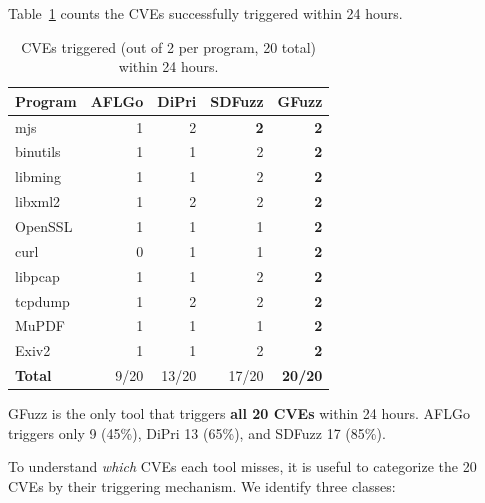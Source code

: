 \documentclass[preprint,12pt,3p]{elsarticle}
\begin{document}
Table~\ref{tbl:bugs} counts the CVEs successfully triggered within 24 hours.

\begin{table}[t]
\centering
\small
\caption{CVEs triggered (out of 2 per program, 20 total) within 24 hours.}
\label{tbl:bugs}
\begin{tabular}{lrrrr}
\toprule
\textbf{Program} & \textbf{AFLGo} & \textbf{DiPri}
  & \textbf{SDFuzz} & \textbf{GFuzz} \\
\midrule
mjs           & 1 & 2 & \textbf{2} & \textbf{2} \\
binutils      & 1 & 1 & 2 & \textbf{2} \\
libming       & 1 & 1 & 2 & \textbf{2} \\
libxml2       & 1 & 2 & 2 & \textbf{2} \\
OpenSSL       & 1 & 1 & 1 & \textbf{2} \\
curl          & 0 & 1 & 1 & \textbf{2} \\
libpcap       & 1 & 1 & 2 & \textbf{2} \\
tcpdump       & 1 & 2 & 2 & \textbf{2} \\
MuPDF         & 1 & 1 & 1 & \textbf{2} \\
Exiv2         & 1 & 1 & 2 & \textbf{2} \\
\midrule
\textbf{Total} & 9/20 & 13/20 & 17/20 & \textbf{20/20} \\
\bottomrule
\end{tabular}
\end{table}

GFuzz is the only tool that triggers \textbf{all 20 CVEs} within 24 hours.
AFLGo triggers only 9 (45\%), DiPri 13 (65\%), and SDFuzz 17 (85\%).

To understand \emph{which} CVEs each tool misses, it is useful to categorize
the 20 CVEs by their triggering mechanism.  We identify three classes:
\end{document}
